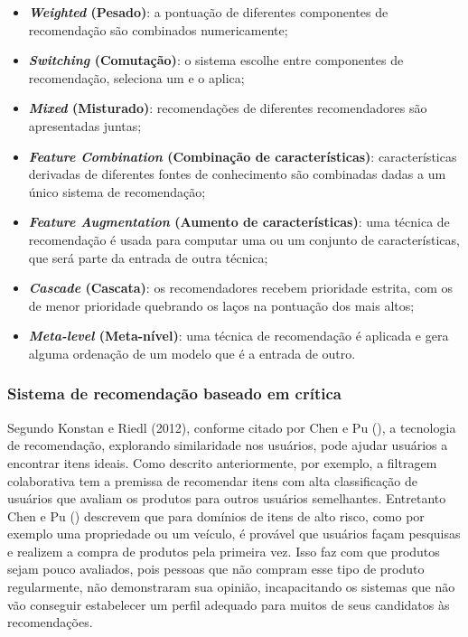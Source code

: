 \begin{itemize}
    \item \textbf{\textit{Weighted} (Pesado)}: a pontuação de diferentes componentes de recomendação são combinados numericamente;
    
    \item \textbf{\textit{Switching} (Comutação)}: o sistema escolhe entre componentes de recomendação, seleciona um e o aplica;
    
    \item \textbf{\textit{Mixed} (Misturado)}: recomendações de diferentes recomendadores são apresentadas juntas;
    
    \item \textbf{\textit{Feature Combination} (Combinação de características)}: características derivadas de diferentes fontes de conhecimento são combinadas dadas a um único sistema de recomendação;
    
    \item \textbf{\textit{Feature Augmentation} (Aumento de características)}:  uma técnica de recomendação é usada para computar uma ou um conjunto de características, que será parte da entrada de outra técnica;
    
    \item \textbf{\textit{Cascade} (Cascata)}: os recomendadores recebem prioridade estrita, com os de menor prioridade quebrando os laços na pontuação dos mais altos;

    \item \textbf{\textit{Meta-level} (Meta-nível)}: uma técnica de recomendação é aplicada e gera alguma ordenação de um modelo que é a entrada de outro.

\end{itemize}

\subsubsection{Sistema de recomendação baseado em crítica}
\label{Critiquing-based}
Segundo Konstan e Riedl (2012), conforme citado por Chen e Pu (\citeyear{Chen:2012}), a tecnologia de recomendação, explorando similaridade nos usuários, pode ajudar usuários a encontrar itens ideais. Como descrito anteriormente, por exemplo, a filtragem colaborativa tem a premissa de recomendar itens com alta classificação de usuários que avaliam os produtos para outros usuários semelhantes. Entretanto Chen e Pu (\citeyear{Chen:2012}) descrevem que para domínios de itens de alto risco, como por exemplo uma propriedade ou um veículo, é provável que usuários façam pesquisas e realizem a compra de produtos pela primeira vez. Isso faz com que produtos sejam pouco avaliados, pois pessoas que não compram esse tipo de produto regularmente, não demonstraram sua opinião, incapacitando os sistemas que não vão conseguir estabelecer um perfil adequado para muitos de seus candidatos às recomendações.


